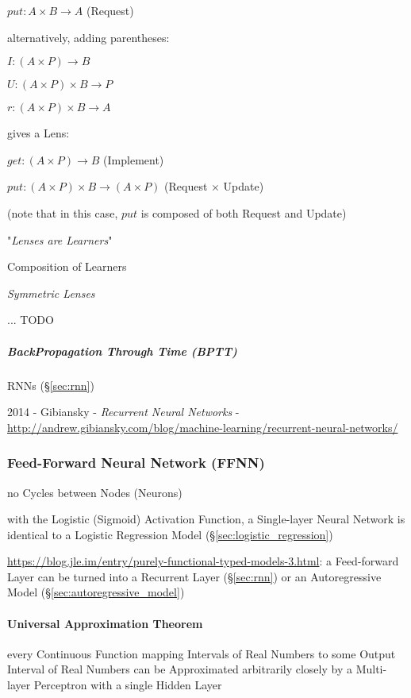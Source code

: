 $put : A \times B \to A$ (Request)

alternatively, adding parentheses:

$I : (A \times P) \to B$

$U : (A \times P) \times B \to P$

$r : (A \times P) \times B \to A$

gives a Lens:

$get : (A \times P) \to B$ (Implement)

$put : (A \times P) \times B \to (A \times P)$ (Request $\times$ Update)

(note that in this case, $put$ is composed of both Request and Update)

"\emph{Lenses are Learners}"

Composition of Learners

\emph{Symmetric Lenses}

... TODO



\subparagraph{BackPropagation Through Time (BPTT)}\label{sec:bptt}\hfill

RNNs (\S\ref{sec:rnn})

2014 - Gibiansky - \emph{Recurrent Neural Networks} -
\url{http://andrew.gibiansky.com/blog/machine-learning/recurrent-neural-networks/}



\subsubsection{Feed-Forward Neural Network (FFNN)}\label{sec:ffnn}

no Cycles between Nodes (Neurons)

with the Logistic (Sigmoid) Activation Function, a Single-layer Neural Network
is identical to a Logistic Regression Model (\S\ref{sec:logistic_regression})

\url{https://blog.jle.im/entry/purely-functional-typed-models-3.html}: a
Feed-forward Layer can be turned into a Recurrent Layer (\S\ref{sec:rnn}) or an
Autoregressive Model (\S\ref{sec:autoregressive_model})



\paragraph{Universal Approximation Theorem}
\label{sec:universal_approximation}\hfill

every Continuous Function mapping Intervals of Real Numbers to some Output
Interval of Real Numbers can be Approximated arbitrarily closely by a
Multi-layer Perceptron with a single Hidden Layer

